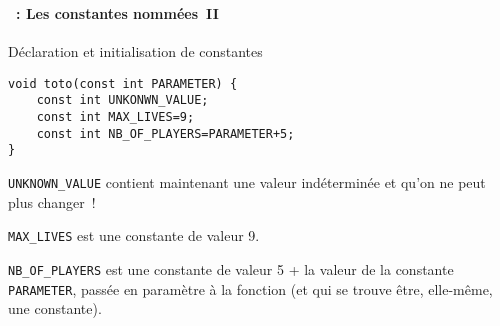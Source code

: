 \begin{frame}[containsverbatim]
  \frametitle{\secname}
  \framesubtitle{\subsecname~: Les constantes nommées~II} 
  \begin{block}{Déclaration et initialisation de constantes}
    \begin{verbatim}
void toto(const int PARAMETER) {
    const int UNKONWN_VALUE;
    const int MAX_LIVES=9;
    const int NB_OF_PLAYERS=PARAMETER+5;
}\end{verbatim}
  \end{block}
  \par
  \verb|UNKNOWN_VALUE| contient maintenant une valeur indéterminée et qu'on ne peut plus changer~!
  \vspace{0.3cm}
  \par
  \verb|MAX_LIVES| est une constante de valeur 9.
  \vspace{0.3cm}
  \par
  \verb|NB_OF_PLAYERS| est une constante de valeur 5 + la valeur de la constante \verb|PARAMETER|, passée en paramètre à la fonction (et qui se trouve être, elle-même, une constante).
\end{frame}

